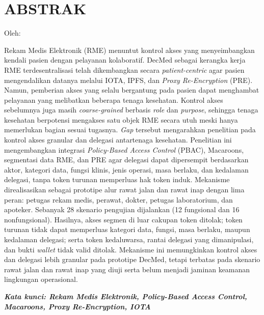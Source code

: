 \clearpage
\chapter*{ABSTRAK}
\begin{center}
	\center
	\begin{singlespace}
		\large\bfseries\MakeUppercase{\thetitle}

		\normalfont\normalsize
		Oleh:

		\bfseries \theauthor
	\end{singlespace}
\end{center}

\begin{singlespace}
	\small
	Rekam Medis Elektronik (RME) menuntut kontrol akses yang menyeimbangkan kendali pasien dengan pelayanan kolaboratif. DecMed sebagai kerangka kerja RME terdesentralisasi telah dikembangkan secara \textit{patient-centric} agar pasien mengendalikan datanya melalui IOTA, IPFS, dan \textit{Proxy Re-Encryption} (PRE). Namun, pemberian akses yang selalu bergantung pada pasien dapat menghambat pelayanan yang melibatkan beberapa tenaga kesehatan. Kontrol akses sebelumnya juga masih \textit{coarse-grained} berbasis \textit{role} dan \textit{purpose}, sehingga tenaga kesehatan berpotensi mengakses satu objek RME secara utuh meski hanya memerlukan bagian sesuai tugasnya. \textit{Gap} tersebut mengarahkan penelitian pada kontrol akses granular dan delegasi antartenaga kesehatan. Penelitian ini mengembangkan integrasi \textit{Policy-Based Access Control} (PBAC), Macaroons, segmentasi data RME, dan PRE agar delegasi dapat dipersempit berdasarkan aktor, kategori data, fungsi klinis, jenis operasi, masa berlaku, dan kedalaman delegasi, tanpa token turunan memperluas hak token induk. Mekanisme direalisasikan sebagai prototipe alur rawat jalan dan rawat inap dengan lima peran: petugas rekam medis, perawat, dokter, petugas laboratorium, dan apoteker. Sebanyak 28 skenario pengujian dijalankan (12 fungsional dan 16 nonfungsional). Hasilnya, akses segmen di luar cakupan token ditolak; token turunan tidak dapat memperluas kategori data, fungsi, masa berlaku, maupun kedalaman delegasi; serta token kedaluwarsa, rantai delegasi yang dimanipulasi, dan bukti \textit{wallet} tidak valid ditolak. Mekanisme ini memungkinkan kontrol akses dan delegasi lebih granular pada prototipe DecMed, tetapi terbatas pada skenario rawat jalan dan rawat inap yang diuji serta belum menjadi jaminan keamanan lingkungan operasional.

	\textbf{\textit{Kata kunci: Rekam Medis Elektronik, Policy-Based Access Control, Macaroons, Proxy Re-Encryption, IOTA}}

\end{singlespace}
\clearpage
